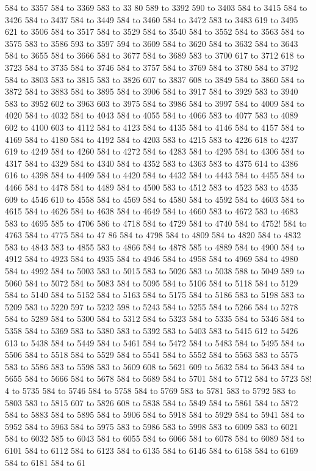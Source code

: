 584 to 3357 584 to 3369 583 to 33
80 589 to 3392 590 to 3403 584 to 3415 584 to 3426 584 to 3437 584 to 3449 584 to 3460 584 to 3472 583 to 3483 619 to 3495 621 to 3506 584 to 3517 584 to 3529 584 to 3540 584 to 3552 584 to 3563 584 to 3575 583 to 3586 593 to 3597 594 to 3609 584 to 3620 584 to 3632 584 to 3643 584 to 3655 584 to 3666 584 to 3677 584 to 3689 583 to 3700 617 to 3712 618 to 3723 584 to 3735 584 to 3746 584 to 3757 584 to 3769 584 to 3780 584 to 3792 584 to 3803 583 to
 3815 583 to 3826 607 to 3837 608 to 3849 584 to 3860 584 to 3872 584 to 3883 584 to 3895 584 to 3906 584 to 3917 584 to 3929 583 to 3940 583 to 3952 602 to 3963 603 to 3975 584 to 3986 584 to 3997 584 to 4009 584 to 4020 584 to 4032 584 to 4043 584 to 4055 584 to 4066 583 to 4077 583 to 4089 602 to 4100 603 to 4112 584 to 4123 584 to 4135 584 to 4146 584 to 4157 584 to 4169 584 to 4180 584 to 4192 584 to 4203 583 to 4215 583 to 4226 618 to 4237 619 to 4249 584 to 4260 584 to 4272 584 to 4283 584 to 4295 584 to 4306 584 to 4317 584 to 4329 584 to 4340 584 to 4352 583 to 4363 583 to 4375 614 to 4386 616 to 4398 584 to 4409 584 to 4420 584 to 4432 584 to 4443 584 to 4455 584 to 4466 584 to 4478 584 to 4489 584 to 4500 583 to 4512 583 to 4523 583 to 4535 609 to 4546 610 to 4558 584 to 4569 584 to 4580 584 to 4592 584 to 4603 584 to 4615 584 to 4626 584 to 4638 584 to 4649 584 to 4660 583 to 4672 583 to 4683 583 to 4695 585 to 4706 586 to 4718 584 to 4729 584 to 4740 584 to 4752!
 584 to 4763 584 to 4775 584 to 47
86 584 to 4798 584 to 4809 584 to 4820 584 to 4832 583 to 4843 583 to 4855 583 to 4866 584 to 4878 585 to 4889 584 to 4900 584 to 4912 584 to 4923 584 to 4935 584 to 4946 584 to 4958 584 to 4969 584 to 4980 584 to 4992 584 to 5003 583 to 5015 583 to 5026 583 to 5038 588 to 5049 589 to 5060 584 to 5072 584 to 5083 584 to 5095 584 to 5106 584 to 5118 584 to 5129 584 to 5140 584 to 5152 584 to 5163 584 to 5175 584 to 5186 583 to 5198 583 to 5209 583 to 5220 597 to 5232 598 to 5243 584 to 5255 584 to 5266 584 to 5278 584 to 5289 584 to 5300 584 to 5312 584 to 5323 584 to 5335 584 to 5346 584 to 5358 584 to 5369 583 to 5380 583 to 5392 583 to 5403 583 to 5415 612 to 5426 613 to 5438 584 to 5449 584 to 5461 584 to 5472 584 to 5483 584 to 5495 584 to 5506 584 to 5518 584 to 5529 584 to 5541 584 to 5552 584 to 5563 583 to 5575 583 to 5586 583 to 5598 583 to 5609 608 to 5621 609 to 5632 584 to 5643 584 to 5655 584 to 5666 584 to 5678 584 to 5689 584 to 5701 584 to 5712 584 to 5723 58!
4 to 5735 584 to 5746 584 to 5758 
584 to 5769 583 to 5781 583 to 5792 583 to 5803 583 to 5815 607 to 5826 608 to 5838 584 to 5849 584 to 5861 584 to 5872 584 to 5883 584 to 5895 584 to 5906 584 to 5918 584 to 5929 584 to 5941 584 to 5952 584 to 5963 584 to 5975 583 to 5986 583 to 5998 583 to 6009 583 to 6021 584 to 6032 585 to 6043 584 to 6055 584 to 6066 584 to 6078 584 to 6089 584 to 6101 584 to 6112 584 to 6123 584 to 6135 584 to 6146 584 to 6158 584 to 6169 584 to 6181 584 to 61
